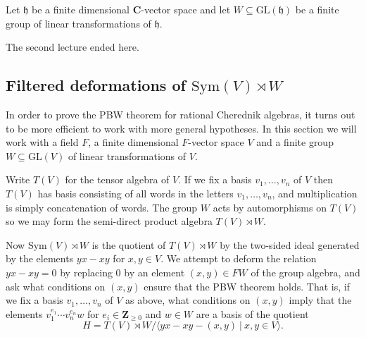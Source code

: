 \documentclass[12pt, reqno]{amsart}
\numberwithin{equation}{section}
\theoremstyle{definition}
\theoremstyle{plain}
\newcommand{\CC}{\mathbf{C}}
\newcommand{\ZZ}{\mathbf{Z}}
\newcommand{\hh}{\mathfrak{h}}
\newcommand{\la}{\langle}
\newcommand{\ra}{\rangle}
\begin{document}
Let $\hh$ be a finite dimensional $\CC$-vector space and let $W \subseteq \mathrm{GL}(\hh)$ be a finite group of linear transformations of $\hh$. 

The second lecture ended here.

\subsection{Filtered deformations of $\mathrm{Sym}(V) \rtimes W$}

In order to prove the PBW theorem for rational Cherednik algebras, it turns out to be more efficient to work with more general hypotheses. In this section we will work with a field $F$, a finite dimensional $F$-vector space $V$ and a finite group $W \subseteq \mathrm{GL}(V)$ of linear transformations of $V$.

Write $T(V)$ for the tensor algebra of $V$. If we fix a basis $v_1,\dots,v_n$ of $V$ then $T(V)$ has basis consisting of all words in the letters $v_1,\dots,v_n$, and multiplication is simply concatenation of words. The group $W$ acts by automorphisms on $T(V)$ so we may form the semi-direct product algebra $T(V) \rtimes W$.

Now $\mathrm{Sym}(V) \rtimes W$ is the quotient of $T(V) \rtimes W$ by the two-sided ideal generated by the elements $yx-xy$ for $x,y \in V$. We attempt to deform the relation $yx-xy=0$ by replacing $0$ by an element $(x, y) \in FW$ of the group algebra, and ask what conditions on $(x,y)$ ensure that the PBW theorem holds. That is, if we fix a basis $v_1,\dots,v_n$ of $V$ as above, what conditions on $(x,y)$ imply that the elements $v_1^{e_1} \cdots v_n^{e_n} w$ for $e_i \in \ZZ_{\geq 0}$ and $w \in W$ are a basis of the quotient
$$H=T(V) \rtimes W / \la yx-xy-(x,y) \ | \ x,y \in V \ra.$$ 
\end{document}
